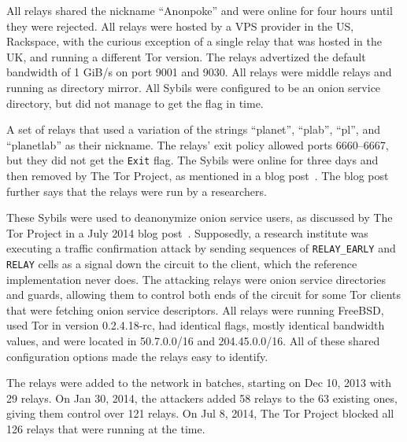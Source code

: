 All relays shared the nickname ``Anonpoke'' and were online for four hours until
they were rejected.  All relays were hosted by a VPS provider in the US,
Rackspace, with the curious exception of a single relay that was hosted in the
UK, and running a different Tor version.  The relays advertized the default
bandwidth of 1 GiB/s on port 9001 and 9030.  All relays were middle relays and
running as directory mirror.  All Sybils were configured to be an onion service
directory, but did not manage to get the flag in time.

A set of relays that used a variation of the strings ``planet'', ``plab'',
``pl'', and ``planetlab'' as their nickname.  The relays' exit policy allowed
ports 6660--6667, but they did not get the \texttt{Exit} flag.  The Sybils were
online for three days and then removed by The Tor Project, as mentioned in a
blog post~\cite{progressreport}.  The blog post further says that the relays
were run by a researchers.

These Sybils were used to deanonymize onion service users, as discussed by The
Tor Project in a July 2014 blog post~\cite{cmucert}.  Supposedly, a research
institute was executing a traffic confirmation attack by sending sequences of
\texttt{RELAY\_EARLY} and \texttt{RELAY} cells as a signal down the circuit to
the client, which the reference implementation never does.  The attacking relays
were onion service directories and guards, allowing them to control both ends of
the circuit for some Tor clients that were fetching onion service descriptors.
All relays were running FreeBSD, used Tor in version 0.2.4.18-rc, had identical
flags, mostly identical bandwidth values, and were located in 50.7.0.0/16 and
204.45.0.0/16.  All of these shared configuration options made the relays easy
to identify.

The relays were added to the network in batches, starting on Dec 10, 2013 with
29 relays.  On Jan 30, 2014, the attackers added 58 relays to the 63 existing
ones, giving them control over 121 relays.  On Jul 8, 2014, The Tor Project
blocked all 126 relays that were running at the time.

% 

